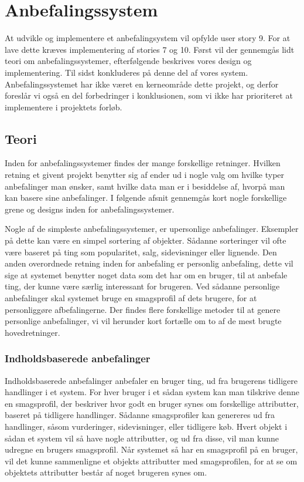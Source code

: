 \section{Anbefalingssystem}\label{anbefaling}
At udvikle og implementere et anbefalingsystem vil opfylde user story 9.
For at lave dette kræves implementering af stories 7 og 10.
Først vil der gennemgås lidt teori om anbefalingssystemer, efterfølgende beskrives vores design og implementering.
Til sidst konkluderes på denne del af vores system.
Anbefalingssystemet har ikke været en kerneområde dette projekt, og derfor foreslår vi også en del forbedringer i konklusionen, som vi ikke har prioriteret at implementere i projektets forløb.

\subsection{Teori}
Inden for anbefalingssystemer findes der mange forskellige retninger.
Hvilken retning et givent projekt benytter sig af ender ud i nogle valg om hvilke typer anbefalinger man ønsker, samt hvilke data man er i besiddelse af, hvorpå man kan basere sine anbefalinger.
I følgende afsnit gennemgås kort nogle forskellige grene og designs inden for anbefalingssystemer.

Nogle af de simpleste anbefalingssystemer, er upersonlige anbefalinger.
Eksempler på dette kan være en simpel sortering af objekter.
Sådanne sorteringer vil ofte være baseret på ting som popularitet, salg, sidevisninger eller lignende.
Den anden overordnede retning inden for anbefaling er personlig anbefaling, dette vil sige at systemet benytter noget data som det har om en bruger, til at anbefale ting, der kunne være særlig interessant for brugeren.
Ved sådanne personlige anbefalinger skal systemet bruge en smagsprofil af dets brugere, for at personliggøre afbefalingerne.
Der findes flere forskellige metoder til at genere personlige anbefalinger, vi vil herunder kort fortælle om to af de mest brugte hovedretninger\citep{RecommenderSystems}.

\subsubsection{Indholdsbaserede anbefalinger}
Indholdsbaserede anbefalinger anbefaler en bruger ting, ud fra brugerens tidligere handlinger i et system.
For hver bruger i et sådan system kan man tilskrive denne en smagsprofil, der beskriver hvor godt en bruger synes om forskellige attributter, baseret på tidligere handlinger.
Sådanne smagsprofiler kan genereres ud fra handlinger, såsom vurderinger, sidevisninger, eller tidligere køb.
Hvert objekt i sådan et system vil så have nogle attributter, og ud fra disse, vil man kunne udregne en brugers smagsprofil.
Når systemet så har en smagsprofil på en bruger, vil det kunne sammenligne et objekts attributter med smagsprofilen, for at se om objektets attributter består af noget brugeren synes om.

